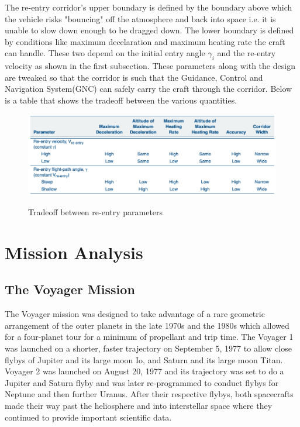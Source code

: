 \documentclass[12pt, letterpaper]{article}
\begin{document}
The re-entry corridor's upper boundary is defined by the boundary above which the vehicle risks "bouncing" off the atmosphere and back into space i.e. it is unable to slow down enough to be dragged down. The lower boundary is defined by conditions like maximum decelaration and maximum heating rate the craft can handle. These two depend on the initial entry angle $\gamma_i$ and the re-entry velocity as shown in the first subsection. These parameters along with the design are tweaked so that the corridor is such that the Guidance, Control and Navigation System(GNC) can safely carry the craft through the corridor. Below is a table that shows the tradeoff between the various quantities.

\begin{figure}[ht]
	\centering
    \includegraphics[width=\textwidth]{tradeoff}
    \label{fig:tradeoff}
    \caption{Tradeoff between re-entry parameters}
\end{figure}
 
 \newpage

\section{Mission Analysis}
\subsection{The Voyager Mission}
The Voyager mission was designed to take advantage of a rare geometric arrangement of the outer planets in the late 1970s and the 1980s which allowed for a four-planet tour for a minimum of propellant and trip time. The Voyager 1 was launched on a shorter, faster trajectory on September 5, 1977 to allow  close flybys of Jupiter and its large moon Io, and Saturn and its large moon Titan. Voyager 2 was launched on August 20, 1977 and its trajectory was set to do a Jupiter and Saturn flyby and was later re-programmed to conduct flybys for Neptune and then further Uranus. After their respective flybys, both spacecrafts made their way past the heliosphere and into interstellar space where they continued to provide important scientific data. 
\end{document}
